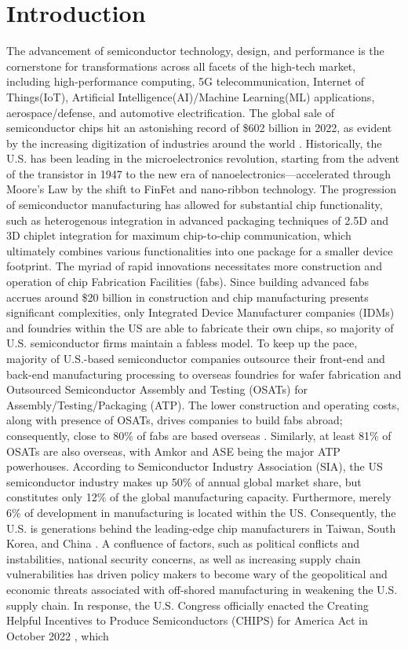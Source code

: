 \section{Introduction}\label{sec1:introduction}
The advancement of semiconductor technology, design, and performance is the cornerstone for transformations across all facets of the high-tech market, including high-performance computing, 5G telecommunication, Internet of Things(IoT), Artificial Intelligence(AI)/Machine Learning(ML) applications, aerospace/defense, and automotive electrification. The global sale of semiconductor chips hit an astonishing record of \$602 billion in 2022, as evident by the increasing digitization of industries around the world \cite{semiconductor_report}. Historically, the U.S. has been leading in the microelectronics revolution, starting from the advent of the transistor in 1947 to the new era of nanoelectronics—accelerated through Moore’s Law by the shift to FinFet and nano-ribbon technology. The progression of semiconductor manufacturing has allowed for substantial chip functionality, such as heterogenous integration in advanced packaging techniques of 2.5D and 3D chiplet integration for maximum chip-to-chip communication, which ultimately combines various functionalities into one package for a smaller device footprint. The myriad of rapid innovations necessitates more construction and operation of chip Fabrication Facilities (fabs). Since building advanced fabs accrues around \$20 billion in construction and chip manufacturing presents significant complexities, only Integrated Device Manufacturer companies (IDMs) and foundries within the US are able to fabricate their own chips, so majority of U.S. semiconductor firms maintain a fabless model. To keep up the pace, majority of U.S.-based semiconductor companies outsource their front-end and back-end manufacturing processing to overseas foundries for wafer fabrication and Outsourced Semiconductor Assembly and Testing (OSATs) for Assembly/Testing/Packaging (ATP). The lower construction and operating costs, along with presence of OSATs, drives companies to build fabs abroad; consequently, close to 80\% of fabs are based overseas \cite{fueling_american}. Similarly, at least 81\% of OSATs are also overseas, with Amkor and ASE being the major ATP powerhouses. According to Semiconductor Industry Association (SIA), the US semiconductor industry makes up 50\% of annual global market share, but constitutes only 12\% of the global manufacturing capacity. Furthermore, merely 6\% of development in manufacturing is located within the US. Consequently, the U.S. is generations behind the leading-edge chip manufacturers in Taiwan, South Korea, and China \cite{Shivakumar2022}. A confluence of factors, such as political conflicts and instabilities, national security concerns, as well as increasing supply chain vulnerabilities has driven policy makers to become wary of the geopolitical and economic threats associated with off-shored manufacturing in weakening the U.S. supply chain. In response, the U.S. Congress officially enacted the Creating Helpful Incentives to Produce Semiconductors (CHIPS) for America Act in October 2022 \cite{sia_2022}, which 